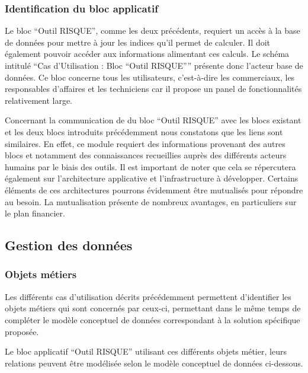\subsubsection{Identification du bloc applicatif}

Le bloc “Outil RISQUE”, comme les deux précédents, requiert un accès à la base de données pour mettre à jour les indices qu’il permet de calculer. Il doit également pouvoir accéder aux informations alimentant ces calculs. Le schéma intitulé “Cas d’Utilisation : Bloc “Outil RISQUE”” présente donc l’acteur base de données. Ce bloc concerne tous les utilisateurs, c’est-à-dire les commerciaux, les responsables d’affaires et les techniciens car il propose un panel de fonctionnalités relativement large.


Concernant la communication de du bloc “Outil RISQUE” avec les blocs existant et les deux blocs introduits précédemment nous constatons que les liens sont similaires. En effet, ce module requiert des informations provenant des autres blocs et notamment des connaissances recueillies auprès des différents acteurs humains par le biais des outils. Il est important de noter que cela se répercutera également sur l’architecture applicative et l’infrastructure à développer. Certains éléments de ces architectures pourrons évidemment être mutualisés pour répondre au besoin. La mutualisation présente de nombreux avantages, en particuliers sur le plan financier.


\subsection{Gestion des données}

\subsubsection{Objets métiers}

Les différents cas d’utilisation décrits précédemment permettent d’identifier les objets métiers qui sont concernés par ceux-ci, permettant dans le même temps de compléter le modèle conceptuel de données correspondant à la solution spécifique proposée.


Le bloc applicatif “Outil RISQUE” utilisant ces différents objets métier, leurs relations peuvent être modélisée selon le modèle conceptuel de données ci-dessous.

